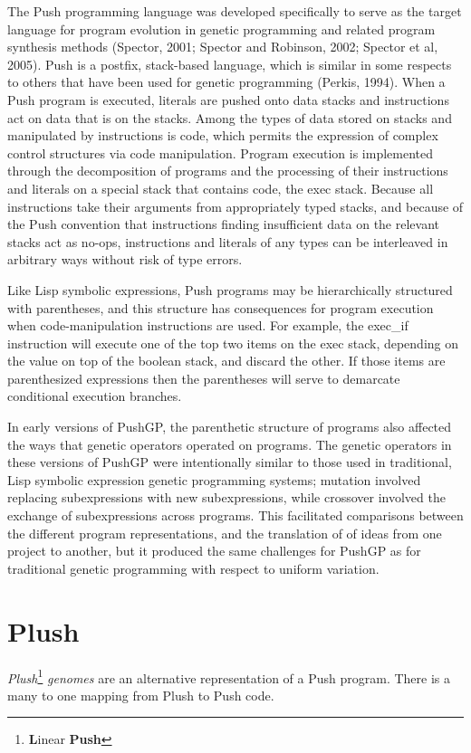 The Push programming language was developed specifically to serve as the target language for program evolution in genetic programming and related program synthesis methods
(Spector, 2001; Spector and Robinson, 2002; Spector et al, 2005). Push is a postfix, stack-based language, which is similar in some respects to others that have been used for genetic programming (Perkis, 1994). 
When a Push program is executed, literals are pushed
onto data stacks and instructions act on data that is on the stacks.
Among the types of data stored on stacks and manipulated by instructions is {\ttfamily code}, which permits the expression of complex control structures via code manipulation. Program execution is implemented through the decomposition of programs and the processing of their instructions and literals on a special stack that contains code, the {\ttfamily exec} stack.
Because all instructions take their arguments from appropriately typed stacks, and because of the Push convention that instructions finding insufficient data on the relevant stacks
act as {\ttfamily no-op}s, instructions and literals of any types can be interleaved in arbitrary ways without risk of type errors.

Like Lisp symbolic expressions, Push programs may be hierarchically
structured with parentheses, and this structure has consequences for program execution when code-manipulation instructions are used. For example, the {\ttfamily exec\_if} instruction will execute one of the top two items on the {\ttfamily exec} stack, depending on the value on top of the {\ttfamily boolean} stack, and discard the other. If those items are parenthesized expressions then the parentheses will serve to demarcate conditional execution branches.

In early versions of PushGP, the parenthetic structure of programs also affected the ways that  genetic
operators operated on programs. The genetic operators in these versions of PushGP were intentionally similar to those used in traditional, Lisp symbolic expression genetic programming systems; mutation involved replacing subexpressions with new subexpressions, while crossover involved the exchange of subexpressions across programs. This facilitated comparisons between the different program representations, and the translation of of ideas from one project to another, but it produced the same challenges for PushGP as for traditional genetic programming with respect to uniform variation.


\section{Plush}
\textit{Plush}\footnote{\textbf{L}inear \textbf{Push}} \textit{genomes} are
an alternative representation of a Push program. There is a many to one mapping
from Plush to Push code.



